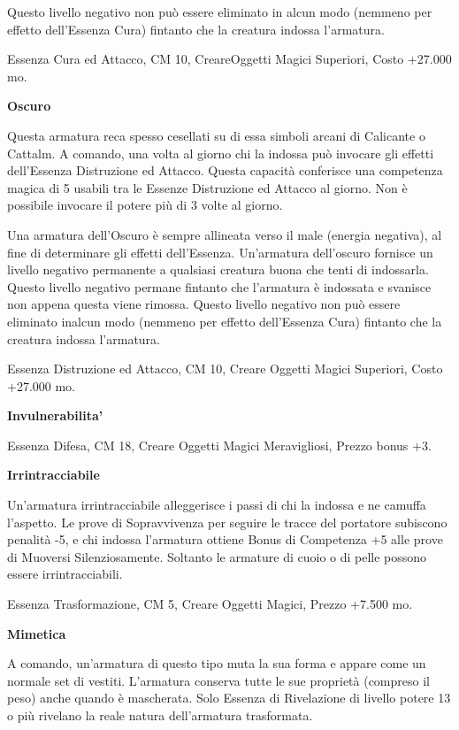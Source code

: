 \documentclass[a4paper,11pt,twoside,openany]{book}
\begin{document}
{Questo livello negativo non può essere eliminato in alcun modo (nemmeno per effetto dell'Essenza Cura) fintanto che la creatura indossa l'armatura.

Essenza Cura ed Attacco, CM 10, CreareOggetti Magici Superiori, Costo +27.000 mo.

\textbf{Oscuro}

Questa armatura reca spesso cesellati su di essa simboli arcani di Calicante o Cattalm. A comando, una volta al giorno chi la indossa può invocare gli effetti dell'Essenza Distruzione ed Attacco. Questa capacità conferisce una competenza magica di 5 usabili tra le Essenze Distruzione ed Attacco al giorno. Non è possibile invocare il potere più di 3 volte al giorno.

Una armatura dell'Oscuro è sempre allineata verso il male (energia negativa), al fine di determinare gli effetti dell'Essenza. Un'armatura dell'oscuro fornisce un livello negativo permanente a qualsiasi creatura buona che tenti di indossarla. Questo livello negativo permane fintanto che l'armatura è indossata e svanisce non appena questa viene rimossa. Questo livello negativo non può essere eliminato inalcun modo (nemmeno per effetto dell'Essenza Cura) fintanto che la creatura indossa l'armatura. 

Essenza Distruzione ed Attacco, CM 10, Creare Oggetti Magici Superiori,
Costo +27.000 mo.

\textbf{Invulnerabilita'}

Essenza Difesa, CM 18, Creare Oggetti Magici Meravigliosi, Prezzo bonus +3.

\textbf{Irrintracciabile}

Un'armatura irrintracciabile alleggerisce i passi di chi la indossa e ne camuffa l'aspetto. Le prove di Sopravvivenza per seguire le tracce del portatore subiscono penalità -5, e chi indossa l'armatura ottiene Bonus di Competenza +5 alle prove di Muoversi Silenziosamente. Soltanto le armature di cuoio o di pelle possono essere irrintracciabili. 

Essenza Trasformazione, CM 5, Creare Oggetti Magici, Prezzo +7.500
mo.

\textbf{Mimetica}

A comando, un'armatura di questo tipo muta la sua forma e appare come un normale set di vestiti. L'armatura conserva tutte le sue proprietà (compreso il peso) anche quando è mascherata. Solo Essenza di Rivelazione di livello potere 13 o più rivelano la reale natura dell'armatura trasformata.

}
\end{document}
